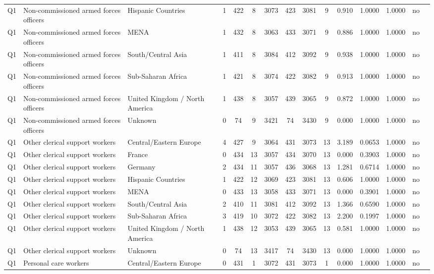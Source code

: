 \begin{longtable}{lllrcccccccccll}
Q1 & Non-commissioned armed forces officers & Hispanic Countries & 1 & 422 & 8 & 3073 & 423 & 3081 & 9 & 0.910 & 1.0000 & 1.0000 & no \\
Q1 & Non-commissioned armed forces officers & MENA & 1 & 432 & 8 & 3063 & 433 & 3071 & 9 & 0.886 & 1.0000 & 1.0000 & no \\
Q1 & Non-commissioned armed forces officers & South/Central Asia & 1 & 411 & 8 & 3084 & 412 & 3092 & 9 & 0.938 & 1.0000 & 1.0000 & no \\
Q1 & Non-commissioned armed forces officers & Sub-Saharan Africa & 1 & 421 & 8 & 3074 & 422 & 3082 & 9 & 0.913 & 1.0000 & 1.0000 & no \\
Q1 & Non-commissioned armed forces officers & United Kingdom / North America & 1 & 438 & 8 & 3057 & 439 & 3065 & 9 & 0.872 & 1.0000 & 1.0000 & no \\
Q1 & Non-commissioned armed forces officers & Unknown & 0 & 74 & 9 & 3421 & 74 & 3430 & 9 & 0.000 & 1.0000 & 1.0000 & no \\
Q1 & Other clerical support workers & Central/Eastern Europe & 4 & 427 & 9 & 3064 & 431 & 3073 & 13 & 3.189 & 0.0653 & 1.0000 & no \\
Q1 & Other clerical support workers & France & 0 & 434 & 13 & 3057 & 434 & 3070 & 13 & 0.000 & 0.3903 & 1.0000 & no \\
Q1 & Other clerical support workers & Germany & 2 & 434 & 11 & 3057 & 436 & 3068 & 13 & 1.281 & 0.6714 & 1.0000 & no \\
Q1 & Other clerical support workers & Hispanic Countries & 1 & 422 & 12 & 3069 & 423 & 3081 & 13 & 0.606 & 1.0000 & 1.0000 & no \\
Q1 & Other clerical support workers & MENA & 0 & 433 & 13 & 3058 & 433 & 3071 & 13 & 0.000 & 0.3901 & 1.0000 & no \\
Q1 & Other clerical support workers & South/Central Asia & 2 & 410 & 11 & 3081 & 412 & 3092 & 13 & 1.366 & 0.6590 & 1.0000 & no \\
Q1 & Other clerical support workers & Sub-Saharan Africa & 3 & 419 & 10 & 3072 & 422 & 3082 & 13 & 2.200 & 0.1997 & 1.0000 & no \\
Q1 & Other clerical support workers & United Kingdom / North America & 1 & 438 & 12 & 3053 & 439 & 3065 & 13 & 0.581 & 1.0000 & 1.0000 & no \\
Q1 & Other clerical support workers & Unknown & 0 & 74 & 13 & 3417 & 74 & 3430 & 13 & 0.000 & 1.0000 & 1.0000 & no \\
Q1 & Personal care workers & Central/Eastern Europe & 0 & 431 & 1 & 3072 & 431 & 3073 & 1 & 0.000 & 1.0000 & 1.0000 & no \\

\end{longtable}
